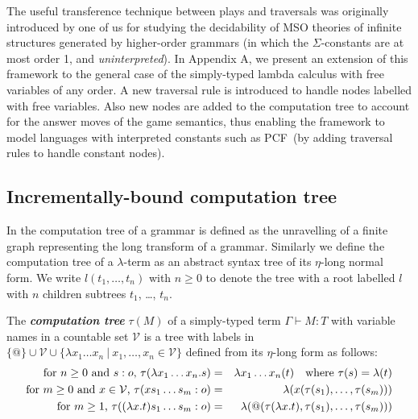 \documentclass{llncs}
\newcommand\defname[1]{{\bf\em #1}\index{#1}}
\newcommand\union{\cup}
\newcommand\pcf{\textsf{PCF}}
\begin{document}
The useful transference technique between plays and traversals was
originally introduced by one of us \cite{OngLics2006} for studying the
decidability of MSO theories of infinite structures generated by
higher-order grammars (in which the $\Sigma$-constants are at most
order 1, and \emph{uninterpreted}).
In Appendix A, we present an extension of this framework to the
general case of the simply-typed lambda calculus with free variables
of any order. A new traversal rule is introduced to handle nodes
labelled with free variables. Also new nodes are added to the
computation tree to account for the answer moves of the game
semantics, thus enabling the framework to model languages with
interpreted constants such as \pcf~(by adding traversal rules to
handle constant nodes).

\subsection*{Incrementally-bound computation tree}

In \cite{OngLics2006} the computation tree of a grammar is defined as
the unravelling of a finite graph representing the long transform of a
grammar. Similarly we define the computation tree of a $\lambda$-term
as an abstract syntax tree of its $\eta$-long normal form.  We write
$l(t_1, \ldots, t_n)$ with $n \geq 0$ to denote the tree with a root
labelled $l$ with $n$ children subtrees $t_1$, \ldots, $t_n$.

\begin{definition}\rm
  The \defname{computation tree} $\tau(M)$ of a simply-typed term
  $\Gamma \vdash M:T$ with variable names in a countable set
  $\mathcal{V}$ is a tree with labels in $ \{ @ \} \union \mathcal{V}
  \union \{ \lambda x_1 \ldots x_n \ | \ x_1 ,\ldots, x_n \in
  \mathcal{V} \}$ defined from its $\eta$-long form as follows:
\begin{eqnarray*}
  \mbox{for $n\geq 0$ and $s:o$, } \tau(\lambda x_1 \ldots x_n . s) &=& \lambda x_1 \ldots x_n(t) \mbox{\quad where $\tau(s) = \lambda(t)$}\\
  \mbox{for $m\geq 0$ and $x \in  \mathcal{V}$, } \tau( x s_1 \ldots s_m : o) &=&  \lambda (x(\tau(s_1),\ldots,\tau(s_m)))\\
  \mbox{for $m \geq 1$, } \tau((\lambda x.t) s_1 \ldots s_m :o) &=& \lambda (@(\tau(\lambda x.t),\tau(s_1),\ldots,\tau(s_m)))
\end{eqnarray*}
\end{definition}
\end{document}
